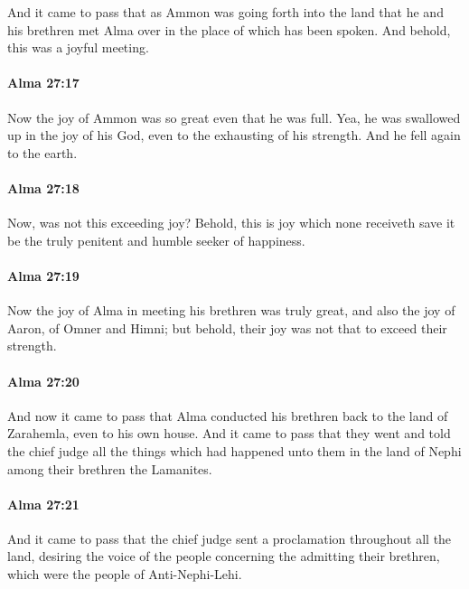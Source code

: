 			And it came to pass that as Ammon was going forth into the land
			that he and his brethren met Alma over in the place of which has been spoken.
			And behold, this was a joyful meeting.

		\paragraph{Alma 27:17} %
			\label{ALMA-27-17}

			Now the joy of Ammon was so great even that he was full.
			Yea, he was swallowed up in the joy of his God,
			even to the exhausting of his strength.
			And he fell again to the earth.

		\paragraph{Alma 27:18} %
			\label{ALMA-27-18}

			Now, was not this exceeding joy?
			Behold, this is joy which none receiveth
			save it be the truly penitent and humble seeker of happiness.

		\paragraph{Alma 27:19} %
			\label{ALMA-27-19}

			Now the joy of Alma in meeting his brethren was truly great,
			and also the joy of Aaron, of Omner and Himni;
			but behold, their joy was not that to exceed their strength.

		\paragraph{Alma 27:20} %
			\label{ALMA-27-20}

			And now it came to pass that Alma conducted his brethren
			back to the land of Zarahemla, even to his own house.
			And it came to pass that they went and told the chief judge
			all the things which had happened unto them
			in the land of Nephi among their brethren the Lamanites.

		\paragraph{Alma 27:21} %
			\label{ALMA-27-21}

			And it came to pass that the chief judge sent a proclamation throughout all the land,
			desiring the voice of the people concerning the admitting their brethren,
			which were the people of Anti-Nephi-Lehi.

